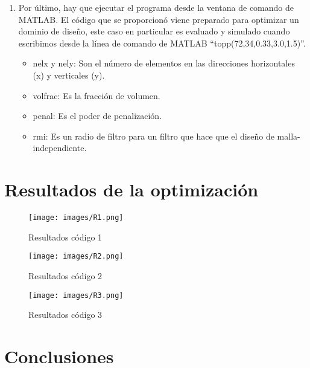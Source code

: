 \documentclass{article}
\begin{document}
\begin{enumerate}
\item   Por último, hay que ejecutar el programa desde la ventana de comando de MATLAB. El código que se proporcionó viene preparado para optimizar un dominio de diseño, este caso en particular es evaluado y simulado cuando escribimos desde la línea de comando de MATLAB “topp(72,34,0.33,3.0,1.5)”.
\begin{itemize}
  \item nelx y nely: Son el número de elementos en las direcciones horizontales (x) y verticales (y). 
   \item	volfrac: Es la fracción de volumen. 
   \item	penal: Es el poder de penalización. 
   \item	rmi: Es un radio de filtro para un filtro que hace que el diseño de malla-independiente.
\end{itemize}

\end{enumerate}

\newpage

\section{Resultados de la optimización}

\begin{figure}[h] %
    \centering
    \texttt{[image: images/R1.png]} %
    \caption{Resultados c\'{o}digo 1}
\end{figure}


\begin{figure}[h] %
    \centering
    \texttt{[image: images/R2.png]} %
    \caption{Resultados c\'{o}digo 2}
\end{figure}

\begin{figure}[h] %
    \centering
    \texttt{[image: images/R3.png]} %
    \caption{Resultados c\'{o}digo 3}
\end{figure}

\newpage

\section{Conclusiones}
\end{document}
